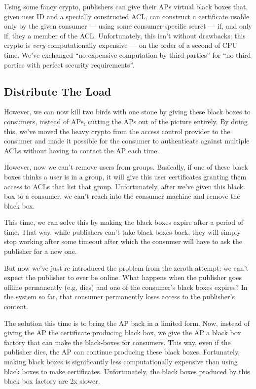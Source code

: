 \documentclass[pdftex,12pt,a4papaer]{report}
\begin{document}
Using some fancy crypto, publishers can give their APs virtual black boxes that,
given user ID and a specially constructed ACL, can construct a certificate
usable only by the given consumer --- using some consumer-specific secret ---
if, and only if, they a member of the ACL. Unfortunately, this isn't without
drawbacks: this crypto is \emph{very} computationally expensive --- on the order
of a second of CPU time. We've exchanged ``no expensive computation by third
parties'' for ``no third parties with perfect security requirements''.

\subsection{Distribute The Load}

However, we can now kill two birds with one stone by giving these black boxes to
consumers, instead of APs, cutting the APs out of the picture entirely. By doing
this, we've moved the heavy crypto from the access control provider to the
consumer and made it possible for the consumer to authenticate against multiple
ACLs without having to contact the AP each time.

However, now we can't remove users from groups. Basically, if one of these black
boxes thinks a user is in a group, it will give this user certificates granting
them access to ACLs that list that group. Unfortunately, after we've given this
black box to a consumer, we can't reach into the consumer machine and remove the
black box.

This time, we can solve this by making the black boxes expire after a period of
time. That way, while publishers can't take black boxes back, they will simply
stop working after some timeout after which the consumer will have to ask the
publisher for a new one.

But now we've just re-introduced the problem from the zeroth attempt: we can't
expect the publisher to ever be online. What happens when the publisher goes
offline permanently (e.g, dies) and one of the consumer's black boxes expires?
In the system so far, that consumer permanently loses access to the publisher's
content.

The solution this time is to bring the AP back in a limited form. Now, instead
of giving the AP the certificate producing black box, we give the AP a black box
factory that can make the black-boxes for consumers. This way, even if the
publisher dies, the AP can continue producing these black boxes. Fortunately,
making black boxes is significantly less computationally expensive than using
black boxes to make certificates. Unfortunately, the black boxes produced by
this black box factory are 2x slower.
\end{document}
